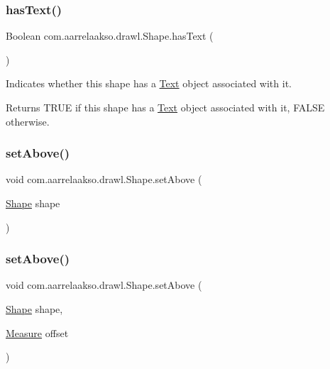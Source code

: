 \subsubsection{\texorpdfstring{has\+Text()}{hasText()}}
{\footnotesize\ttfamily Boolean com.\+aarrelaakso.\+drawl.\+Shape.\+has\+Text (\begin{DoxyParamCaption}{ }\end{DoxyParamCaption})}



Indicates whether this shape has a \hyperlink{classcom_1_1aarrelaakso_1_1drawl_1_1_text}{Text} object associated with it. 

\begin{DoxyReturn}{Returns}
T\+R\+UE if this shape has a \hyperlink{classcom_1_1aarrelaakso_1_1drawl_1_1_text}{Text} object associated with it, F\+A\+L\+SE otherwise. 
\end{DoxyReturn}
\mbox{\label{classcom_1_1aarrelaakso_1_1drawl_1_1_shape_a942b3cf3365498dc1ac6b0309ce33b86}} 
\subsubsection{\texorpdfstring{set\+Above()}{setAbove()}\hspace{0.1cm}{\footnotesize\ttfamily [1/2]}}
{\footnotesize\ttfamily void com.\+aarrelaakso.\+drawl.\+Shape.\+set\+Above (\begin{DoxyParamCaption}\item[{\hyperlink{classcom_1_1aarrelaakso_1_1drawl_1_1_shape}{Shape}}]{shape }\end{DoxyParamCaption})}

\mbox{\label{classcom_1_1aarrelaakso_1_1drawl_1_1_shape_aab165a65f7bd1e55a6de7166577725a3}} 
\subsubsection{\texorpdfstring{set\+Above()}{setAbove()}\hspace{0.1cm}{\footnotesize\ttfamily [2/2]}}
{\footnotesize\ttfamily void com.\+aarrelaakso.\+drawl.\+Shape.\+set\+Above (\begin{DoxyParamCaption}\item[{\hyperlink{classcom_1_1aarrelaakso_1_1drawl_1_1_shape}{Shape}}]{shape,  }\item[{\hyperlink{classcom_1_1aarrelaakso_1_1drawl_1_1_measure}{Measure}}]{offset }\end{DoxyParamCaption})}



